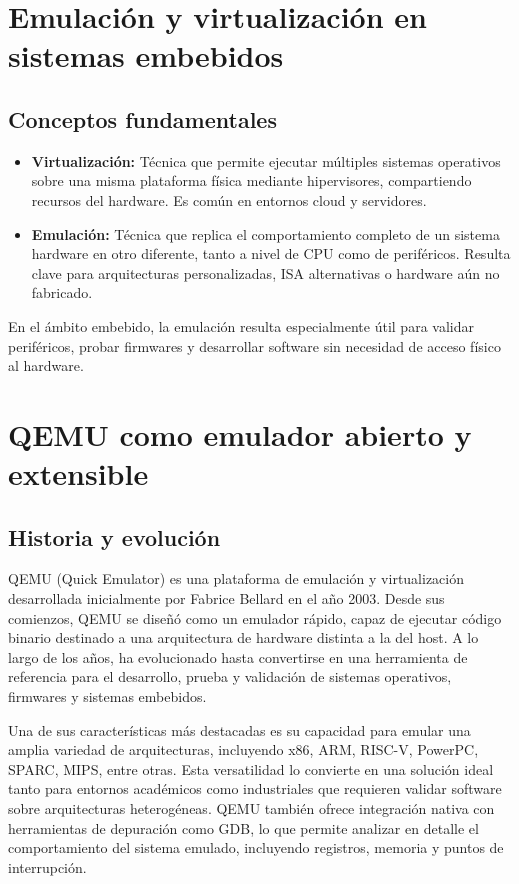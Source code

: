 \section{Emulación y virtualización en sistemas embebidos}

\subsection*{Conceptos fundamentales}

\begin{itemize}
    \item \textbf{Virtualización:} Técnica que permite ejecutar múltiples sistemas operativos sobre una misma plataforma física mediante hipervisores, compartiendo recursos del hardware. Es común en entornos cloud y servidores.
    
    \item \textbf{Emulación:} Técnica que replica el comportamiento completo de un sistema hardware en otro diferente, tanto a nivel de CPU como de periféricos. Resulta clave para arquitecturas personalizadas, ISA alternativas o hardware aún no fabricado.
\end{itemize}

En el ámbito embebido, la emulación resulta especialmente útil para validar periféricos, probar firmwares y desarrollar software sin necesidad de acceso físico al hardware.

\section{QEMU como emulador abierto y extensible}

\subsection{Historia y evolución}

QEMU (Quick Emulator) es una plataforma de emulación y virtualización desarrollada inicialmente por Fabrice Bellard en el año 2003. Desde sus comienzos, QEMU se diseñó como un emulador rápido, capaz de ejecutar código binario destinado a una arquitectura de hardware distinta a la del host. A lo largo de los años, ha evolucionado hasta convertirse en una herramienta de referencia para el desarrollo, prueba y validación de sistemas operativos, firmwares y sistemas embebidos.

Una de sus características más destacadas es su capacidad para emular una amplia variedad de arquitecturas, incluyendo x86, ARM, RISC-V, PowerPC, SPARC, MIPS, entre otras. Esta versatilidad lo convierte en una solución ideal tanto para entornos académicos como industriales que requieren validar software sobre arquitecturas heterogéneas. QEMU también ofrece integración nativa con herramientas de depuración como GDB, lo que permite analizar en detalle el comportamiento del sistema emulado, incluyendo registros, memoria y puntos de interrupción.

